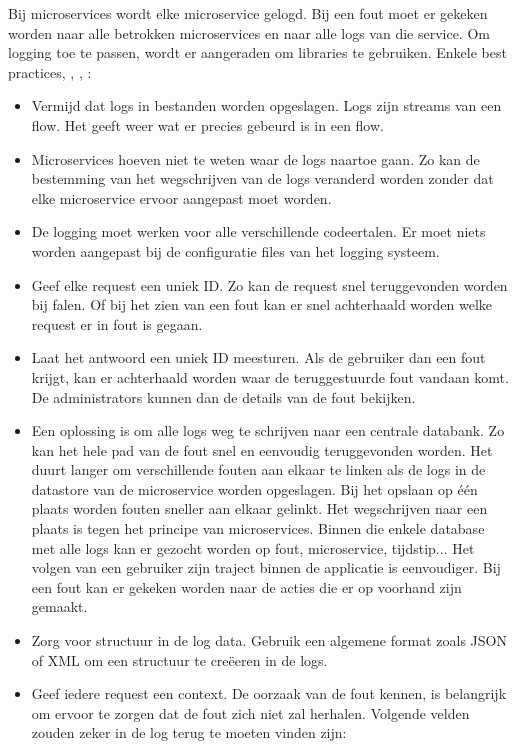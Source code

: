 Bij microservices wordt elke microservice gelogd. Bij een fout moet er gekeken worden naar alle betrokken microservices en naar alle logs van die service. Om logging toe te passen, wordt er aangeraden om libraries te gebruiken. Enkele best practices, \textcite{Melendez2018}, \textcite{Eyee2018}, \textcite{Timms2018}:
\begin{itemize}
	\item Vermijd dat logs in bestanden worden opgeslagen. Logs zijn streams van een flow. Het geeft  weer wat er precies gebeurd is in een flow.
	\item Microservices hoeven niet te weten waar de logs naartoe gaan. Zo kan de bestemming van het  wegschrijven van de logs veranderd worden zonder dat elke microservice ervoor aangepast moet worden.
	\item De logging moet werken voor alle verschillende codeertalen. Er moet niets worden aangepast bij de configuratie files van het logging systeem.
	\item Geef elke request een uniek ID. Zo kan de request snel teruggevonden worden bij falen. Of bij het zien van een fout kan er snel achterhaald worden  welke request er in fout is gegaan. 
	\item Laat het antwoord een uniek ID meesturen. Als de gebruiker dan een fout krijgt, kan er achterhaald worden waar de teruggestuurde fout vandaan komt. De administrators kunnen dan de details van de fout bekijken.
	\item Een oplossing is om alle logs  weg te schrijven naar een centrale databank. Zo kan het hele pad van de fout snel en eenvoudig teruggevonden worden. Het duurt langer om verschillende fouten aan elkaar te linken als de logs in de datastore van de microservice worden opgeslagen. Bij het opslaan op één plaats worden fouten sneller aan elkaar gelinkt. Het  wegschrijven naar een plaats is tegen het principe van microservices. Binnen die enkele database met alle logs kan er gezocht worden op fout, microservice, tijdstip...  Het volgen van een gebruiker zijn traject binnen de applicatie is eenvoudiger. Bij een fout kan er gekeken worden naar de acties die er op voorhand zijn gemaakt. 
	\item Zorg voor structuur in de log data. Gebruik een algemene format zoals JSON of XML om een structuur te creëeren in de logs. 
	\item Geef iedere request een context.  De oorzaak van de fout kennen, is belangrijk om ervoor te zorgen dat de fout zich niet zal herhalen. Volgende velden zouden zeker in de log terug te moeten vinden zijn:

\end{itemize}

